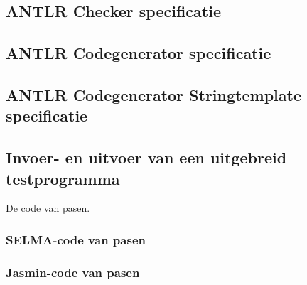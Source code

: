 \documentclass[]{article}
\begin{document}


\newpage
\subsection{ANTLR Checker specificatie}


\newpage
\subsection{ANTLR Codegenerator specificatie}


\begin{landscape}
\newpage
\subsection{ANTLR Codegenerator Stringtemplate specificatie}

\end{landscape}

\newpage
\subsection{Invoer- en uitvoer van een uitgebreid testprogramma}
De code van pasen.

\subsubsection{SELMA-code van pasen}


\newpage
\begin{landscape}
\subsubsection{Jasmin-code van pasen}

\end{landscape}
\end{document}

